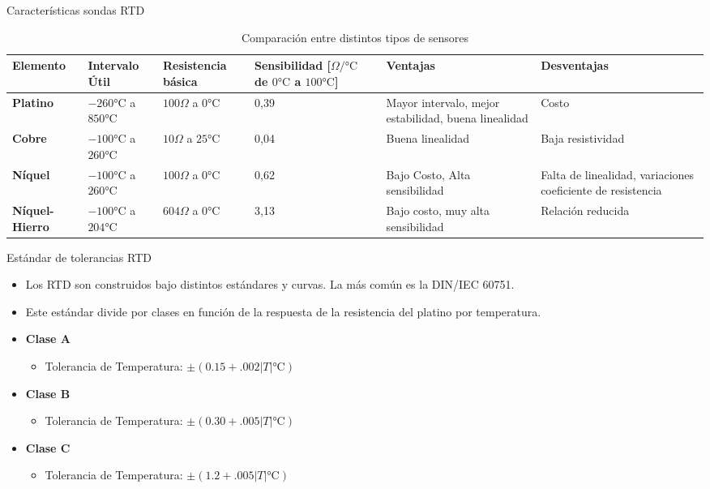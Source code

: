 \documentclass[aspectratio=169]{beamer}
\begin{document}
\begin{frame}{Características sondas RTD}
  \begin{table}[]
    \centering
    \scriptsize{
    \begin{tabular}{m{1.1cm} m{2.2cm} m{1.5cm} m{1.8cm} m{2.6cm} m{2.6cm}}
    \toprule
        \textbf{Elemento} & \textbf{Intervalo Útil} &\textbf{Resistencia básica} & \textbf{Sensibilidad [$\Omega/\si{\celsius}$ de $0\si{\celsius}$ a $100\si{\celsius}$]} & \textbf{Ventajas} & \textbf{Desventajas}\\
    \midrule
       \textbf{Platino} & $-260\si{\celsius}$ a $ 850\si{\celsius}$ & $100\Omega$ a $0\si{\celsius}$   & 0,39 & Mayor intervalo, mejor estabilidad, buena linealidad & Costo\\
       \textbf{Cobre} & $-100\si{\celsius}$ a $ 260\si{\celsius}$ & $10\Omega$ a $25\si{\celsius}$   & 0,04 & Buena linealidad & Baja resistividad\\
       \textbf{Níquel} &  $-100\si{\celsius}$ a $ 260\si{\celsius}$ & $100\Omega$ a $0\si{\celsius}$   & 0,62 & Bajo Costo, Alta sensibilidad & Falta de linealidad, variaciones coeficiente de resistencia\\
       \textbf{Níquel-Hierro} & $-100\si{\celsius}$ a $ 204\si{\celsius}$ & $604\Omega$ a $0\si{\celsius}$   & 3,13 & Bajo costo, muy alta sensibilidad & Relación reducida\\
    \bottomrule
    \end{tabular}
    }
    \caption{Comparación entre distintos tipos de sensores\cite{sole2005instrumentacion}}
    \label{tab:Caracteristicas _rtd}
\end{table}
\end{frame}
\begin{frame}{Estándar de tolerancias RTD}
 \begin{itemize}
     \item Los RTD son construidos bajo distintos estándares y curvas. La más común es la DIN/IEC 60751.
     \item Este estándar divide por clases en función de la respuesta de la resistencia del platino por temperatura. 
     \item \textbf{Clase A}
     \begin{itemize}
         \item Tolerancia de Temperatura: $\pm (0.15 + .002|T| \si{\celsius})$
     \end{itemize}
      \item \textbf{Clase B}
     \begin{itemize}
         \item Tolerancia de Temperatura: $\pm (0.30 + .005|T| \si{\celsius})$
         \end{itemize}
    \item \textbf{Clase C}
     \begin{itemize}
         \item Tolerancia de Temperatura: $\pm (1.2 + .005|T| \si{\celsius})$
     \end{itemize}
 \end{itemize}
\end{frame}
\end{document}

